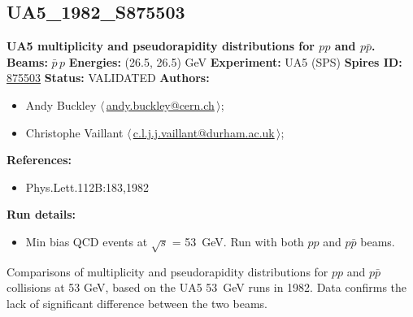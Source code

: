 \subsection[UA5\_1982\_S875503]{UA5\_1982\_S875503\,\cite{Alpgard:1982zx}}
\textbf{UA5 multiplicity and pseudorapidity distributions for $pp$ and $p\bar{p}$.}\newline
\textbf{Beams:} $\bar{p}$\,$p$ \newline
\textbf{Energies:} (26.5, 26.5) GeV \newline
\textbf{Experiment:} UA5 (SPS) \newline
\textbf{Spires ID:} \href{http://www.slac.stanford.edu/spires/find/hep/www?rawcmd=key+875503}{875503}\newline
\textbf{Status:} VALIDATED\newline
\textbf{Authors:}
\begin{itemize}
  \item Andy Buckley $\langle\,$\href{mailto:andy.buckley@cern.ch}{andy.buckley@cern.ch}$\,\rangle$;
  \item Christophe Vaillant $\langle\,$\href{mailto:c.l.j.j.vaillant@durham.ac.uk}{c.l.j.j.vaillant@durham.ac.uk}$\,\rangle$;
\end{itemize}
\textbf{References:}
\begin{itemize}
  \item Phys.Lett.112B:183,1982
\end{itemize}
\textbf{Run details:}
\begin{itemize}

  \item Min bias QCD events at \ensuremath{\sqrt{s}} = 53~GeV. Run with both $pp$ and $p\bar{p}$ beams.\end{itemize}

\noindent Comparisons of multiplicity and pseudorapidity distributions for $pp$ and $p\bar{p}$ collisions at 53 GeV, based on the UA5 53~GeV runs in 1982. Data confirms the lack of significant difference between the two beams.

\clearpage


\clearpage

